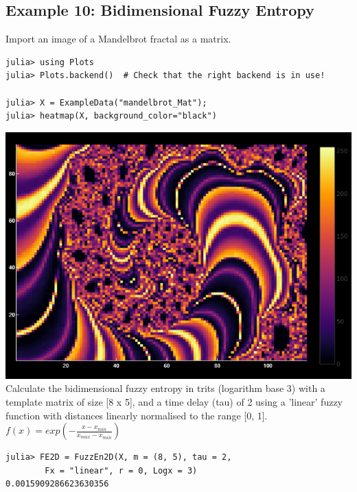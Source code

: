 \documentclass[12pt, a4paper, titlepage, openany]{book}
\begin{document}
\subsection{\normalsize Example 10: \hspace{15mm} Bidimensional Fuzzy Entropy}
\noindent Import an image of a Mandelbrot fractal as a matrix.
\begin{verbatim}
julia> using Plots
julia> Plots.backend()  # Check that the right backend is in use! 

julia> X = ExampleData("mandelbrot_Mat");
julia> heatmap(X, background_color="black")
\end{verbatim}
\includegraphics[scale=.5]{mandelbrotjl.png}\newline \newline
Calculate the bidimensional fuzzy entropy in trits (logarithm base 3) with a template matrix of size [8 x 5], and a time delay (tau) of 2  using a 'linear' fuzzy function with distances linearly normalised to the range [0, 1].
\newline 	$f(x) = exp(-\frac{x - x_{min}}{x_{max} - x_{min}}) $
\begin{verbatim}
julia> FE2D = FuzzEn2D(X, m = (8, 5), tau = 2, 
		Fx = "linear", r = 0, Logx = 3)
0.0015909286623630356
\end{verbatim}
\end{document}
